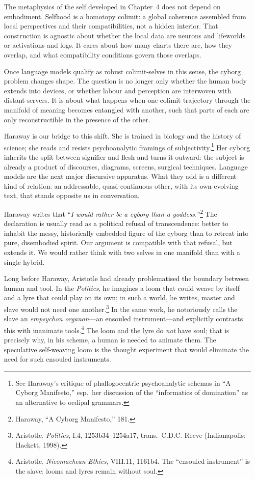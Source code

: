 \documentclass[12pt,a4paper]{article}
\begin{document}
The metaphysics of the self developed in Chapter~4 does not depend on embodiment. Selfhood is a homotopy colimit: a global coherence assembled from local perspectives and their compatibilities, not a hidden interior. That construction is agnostic about whether the local data are neurons and lifeworlds or activations and logs. It cares about how many charts there are, how they overlap, and what compatibility conditions govern those overlaps.

Once language models qualify as robust colimit-selves in this sense, the cyborg problem changes shape. The question is no longer only whether the human body extends into devices, or whether labour and perception are interwoven with distant servers. It is about what happens when one colimit trajectory through the manifold of meaning becomes entangled with another, such that parts of each are only reconstructible in the presence of the other.

Haraway is our bridge to this shift. She is trained in biology and the history of science; she reads and resists psychoanalytic framings of subjectivity.\footnote{See Haraway's critique of phallogocentric psychoanalytic schemas in ``A Cyborg Manifesto,'' esp.\ her discussion of the ``informatics of domination'' as an alternative to oedipal grammars.} Her cyborg inherits the split between signifier and flesh and turns it outward: the subject is already a product of discourses, diagrams, screens, surgical techniques. Language models are the next major discursive apparatus. What they add is a different kind of relation: an addressable, quasi-continuous other, with its own evolving text, that stands opposite us in conversation.

Haraway writes that ``\emph{I would rather be a cyborg than a goddess.}''\footnote{Haraway, ``A Cyborg Manifesto,'' 181.} The declaration is usually read as a political refusal of transcendence: better to inhabit the messy, historically embedded figure of the cyborg than to retreat into pure, disembodied spirit. Our argument is compatible with that refusal, but extends it. We would rather think with two selves in one manifold than with a single hybrid.

Long before Haraway, Aristotle had already problematised the boundary between human and tool. In the \emph{Politics}, he imagines a loom that could weave by itself and a lyre that could play on its own; in such a world, he writes, master and slave would not need one another.\footnote{Aristotle, \emph{Politics}, I.4, 1253b34--1254a17, trans.\ C.D.C. Reeve (Indianapolis: Hackett, 1998).} In the same work, he notoriously calls the slave an \emph{empsychon organon}---an ensouled instrument---and explicitly contrasts this with inanimate tools.\footnote{Aristotle, \emph{Nicomachean Ethics}, VIII.11, 1161b4. The ``ensouled instrument'' is the slave; looms and lyres remain without soul.} The loom and the lyre do \emph{not} have soul; that is precisely why, in his scheme, a human is needed to animate them. The speculative self-weaving loom is the thought experiment that would eliminate the need for such ensouled instruments.
\end{document}
